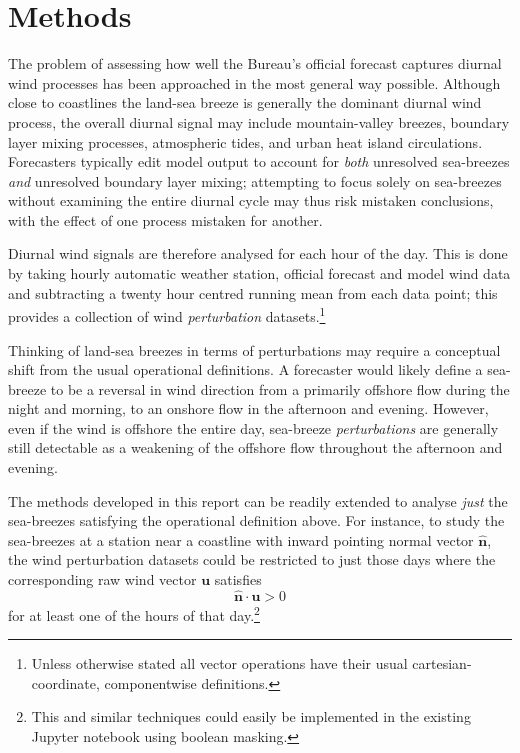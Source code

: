 \documentclass[12pt]{article}
\begin{document}
\section{Methods} \label{methods}
The problem of assessing how well the Bureau's official forecast captures diurnal wind processes has been approached in the most general way possible. Although close to coastlines the land-sea breeze is generally the dominant diurnal wind process, the overall diurnal signal may include mountain-valley breezes, boundary layer mixing processes, atmospheric tides, and urban heat island circulations. Forecasters typically edit model output to account for \emph{both} unresolved sea-breezes \emph{and} unresolved boundary layer mixing; attempting to focus solely on sea-breezes without examining the entire diurnal cycle may thus risk mistaken conclusions, with the effect of one process mistaken for another.

Diurnal wind signals are therefore analysed for each hour of the day. This is done by taking hourly automatic weather station, official forecast and model wind data and subtracting a twenty hour centred running mean from each data point; this provides a collection of wind \emph{perturbation} datasets.\footnote{Unless otherwise stated all vector operations have their usual cartesian-coordinate, componentwise definitions.} 

Thinking of land-sea breezes in terms of perturbations may require a conceptual shift from the usual operational definitions. A forecaster would likely define a sea-breeze to be a reversal in wind direction from a primarily offshore flow during the night and morning, to an onshore flow in the afternoon and evening. However, even if the wind is offshore the entire day, sea-breeze \emph{perturbations} are generally still detectable as a weakening of the offshore flow throughout the afternoon and evening. 

The methods developed in this report can be readily extended to analyse \emph{just} the sea-breezes satisfying the operational definition above. For instance, to study the sea-breezes at a station near a coastline with inward pointing normal vector $\widehat{\boldsymbol{n}}$, the wind perturbation datasets could be restricted to just those days where the corresponding raw wind vector $\boldsymbol{u}$ satisfies 
\begin{equation}
\widehat{\boldsymbol{n}} \cdot \boldsymbol{u} > 0
\end{equation}
for at least one of the hours of that day.\footnote{This and similar techniques could easily be implemented in the existing Jupyter notebook using boolean masking.}
\end{document}
